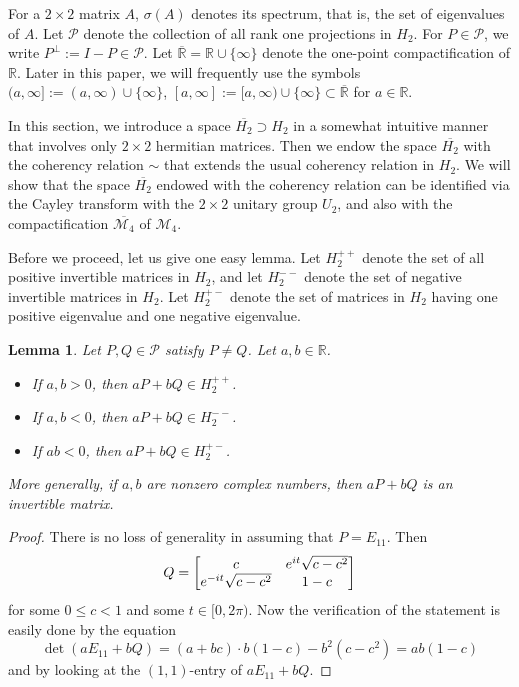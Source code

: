\documentclass[10pt]{amsart}
\newtheorem{lemma}[theorem]{Lemma}
\theoremstyle{definition}
\theoremstyle{remark}
\numberwithin{subsection}{section}
\numberwithin{equation}{section}
\newcommand\cP{{\mathcal{P}}}
\newcommand\oH{{\overline{H_2}}}
\newcommand\oR{{\overline{\mathbb{R}}}}
\begin{document}
For a $2 \times 2$ matrix $A$,  $\sigma(A)$  denotes its spectrum, that is, the set of eigenvalues of $A$.
Let $\cP$  denote the collection of all rank one projections in $H_2$.
For $P\in \mathcal{P}$, we write $P^\perp:= I-P\in \mathcal{P}$. 
Let $\oR=\mathbb{R}\cup\{\infty\}$\index{$\infty$}\index{$R$@$\oR$} denote the one-point compactification of $\mathbb{R}$. Later in this paper, we will frequently use the symbols $(a,\infty] :=(a, \infty)\cup \{\infty\}$\index{$a$1@$(a,\infty]$}, $[a,\infty] :=[a, \infty)\cup \{\infty\}\subset \oR$  for $a\in \mathbb{R}$.

In this section, we introduce a space $\oH\supset H_2$ in a somewhat intuitive manner that involves only $2\times 2$ hermitian matrices. 
Then we endow the space $\oH$ with the coherency relation $\sim$ that extends the usual coherency relation in $H_2$.
We will show that the space $\oH$ endowed with the coherency relation can be identified via the Cayley transform with the $2\times 2$ unitary group $U_2$, and also with the compactification $\overline{\mathcal{M}_4}$ of $\mathcal{M}_4$.

Before we proceed, let us give one easy lemma. 
Let $H_{2}^{++}$ denote the set of all positive invertible matrices in $H_2$, and let $H_{2}^{--}$ denote the set of negative invertible matrices in $H_2$.
Let $H_{2}^{+-}$  denote the set of matrices in $H_2$ having one positive eigenvalue and one negative eigenvalue. 

\begin{lemma}\label{apbq}
Let $P,Q\in \cP$ satisfy $P\neq Q$. Let $a,b\in \mathbb{R}$. 
\begin{itemize}
\item If $a,b>0$, then $aP+bQ\in H_2^{++}$. 
\item If $a,b<0$, then $aP+bQ\in H_2^{--}$. 
\item If $ab<0$, then $aP+bQ\in H_2^{+-}$. 
\end{itemize}
More generally, if $a,b$ are nonzero complex numbers, then $aP+bQ$ is an invertible matrix.
\end{lemma}
\begin{proof}
There is no loss of generality in assuming that $P=E_{11}$. 
Then
\[
Q=\left[ \begin{matrix} c & e^{it}\sqrt{c-c^2}  \cr e^{-it}\sqrt{c-c^2} & 1-c \cr \end{matrix} \right]
\]
for some $0\leq c<1$ and some $t\in [0,2\pi)$. 
Now the verification of the statement is easily done by the equation
\[
\det(aE_{11}+bQ) = (a+bc)\cdot b(1-c)-b^2(c-c^2) = ab(1-c)
\]
and by looking at the $(1,1)$-entry of $aE_{11}+bQ$.
\end{proof}
\end{document}
